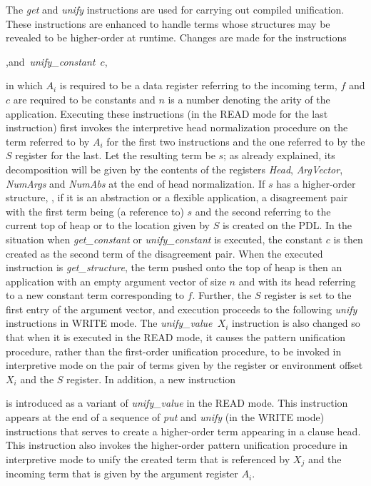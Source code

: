 The {\it get} and {\it unify} instructions are used for carrying out
compiled unification. These instructions are enhanced to handle terms
whose structures may be revealed to be higher-order at runtime.
Changes are made for the instructions
\begin{tabbing}
,\quad and\ {\it unify\_constant\ $c$},
\end{tabbing}
in which $A_i$ is required to be a data register referring to the
incoming term, $f$ and $c$ are required to be constants and $n$ is a
number denoting the arity of the application.
Executing these instructions (in the READ mode for the last
instruction) first invokes the interpretive
head normalization procedure on the term referred to by $A_i$ for the
first two instructions and the one referred to by the $S$ register for
the last. Let the resulting term be $s$; as already explained, its
decomposition will be given by the contents of the registers  {\it Head},
{\it ArgVector}, {\it NumArgs} and {\it NumAbs} at the end of head
normalization. If $s$ has a higher-order
structure, \ie, if it is an abstraction or a flexible application, a
disagreement  pair with the first term being (a reference to) $s$ and
the second referring to the current top
of heap or to the location given by $S$ is created on the PDL.
In the situation when {\it get\_constant} or {\it unify\_constant}
is executed, the constant $c$ is then created as the second term of the
disagreement pair. When the executed instruction is {\it get\_structure},
the term pushed onto the top of heap is then an application with an empty
argument vector of size $n$ and with its head referring to a new constant term
corresponding to $f$. Further, the $S$ register is set to the first entry of
the argument vector, and execution proceeds to the following
{\it unify} instructions in WRITE mode. The {\it unify\_value\ $X_i$}
instruction is also changed so that when it is executed in the READ
mode, it causes the pattern unification procedure, rather than the
first-order unification procedure, to be invoked in interpretive mode
on the pair of terms given by the register or environment offset $X_i$
and the $S$ register.
In addition, a new instruction
\begin{tabbing}
\end{tabbing}
is introduced as a variant of {\it unify\_value} in the READ mode.
This instruction appears at the end of a sequence of {\it put} and
{\it unify} (in the WRITE mode) instructions that serves to create a
higher-order term appearing in a clause head. This instruction also
invokes the higher-order pattern unification procedure in interpretive
mode to unify the created term that is referenced by $X_j$ and the
incoming term that is given by the argument register $A_i$.

